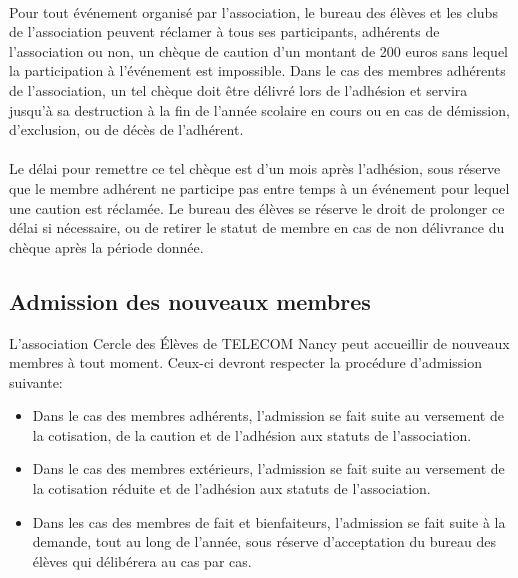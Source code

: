 \documentclass{article} %
\begin{document}
            \paragraph{}
			Pour tout événement organisé par l'association, le bureau des élèves et les
			clubs de l’association peuvent réclamer à tous ses participants,
			adhérents de l’association ou non, un chèque de caution d’un montant
			de 200 euros sans lequel la participation à l’événement est
			impossible. Dans le cas des membres adhérents de l’association, un
			tel chèque doit être délivré lors de l’adhésion et servira jusqu’à
			sa destruction à la fin de l’année scolaire en cours ou en cas de
			démission, d’exclusion, ou de décès de l’adhérent. 

            \paragraph{}
			Le délai pour remettre ce tel chèque est d’un mois après l’adhésion,
			sous réserve que le membre adhérent ne participe pas entre temps à
			un événement pour lequel une caution est réclamée. Le bureau des
			élèves se réserve le droit de prolonger ce délai si nécessaire, ou
			de retirer le statut de membre en cas de non délivrance du chèque
			après la période donnée. 

		\subsection{Admission des nouveaux membres}
\label{sub:admission_des_nouveaux_membres}

			L’association Cercle des Élèves de TELECOM Nancy peut accueillir de
			nouveaux membres à tout moment. Ceux-ci devront respecter la
			procédure d’admission suivante:
			\begin{itemize}
				\item Dans le cas des membres adhérents, l’admission se fait
					suite au versement de la cotisation, de la caution et de
					l’adhésion aux statuts de l’association.
				\item Dans le cas des membres extérieurs, l’admission se fait
					suite au versement de la cotisation réduite et de l’adhésion
					aux statuts de l’association.
				\item Dans les cas des membres de fait et bienfaiteurs, l'admission
				se fait suite à la demande, tout au long de l’année, sous réserve 
				d'acceptation du bureau des élèves qui délibérera au cas par cas.
			\end{itemize}
\end{document}
